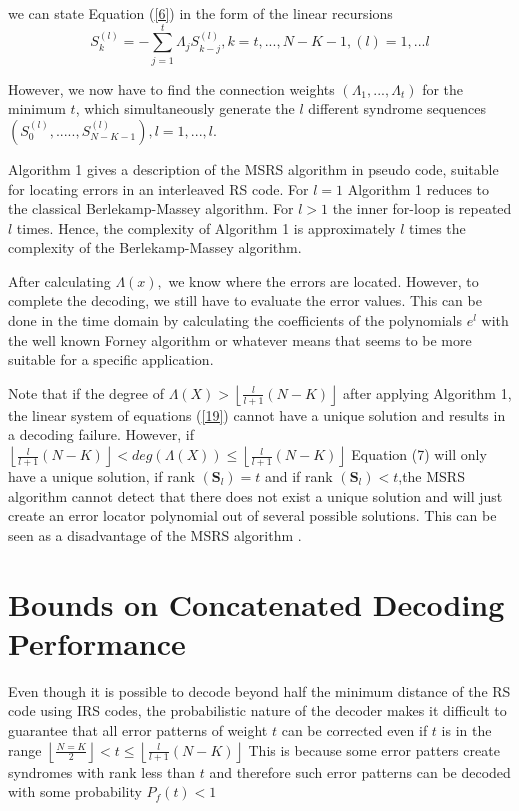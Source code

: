 \documentclass[fontsize=12pt]{article}
\begin{document}
we can state Equation (\ref{6}) in the form of the linear recursions
\begin{equation}
S_k^{(\mathit{l})} = -\sum_{j=1}^{t} \Lambda_jS_{k-j}^{(\mathit{l})}, k=t,...,N-K-1, (\mathit{l})=1,...l
\end{equation}

However, we now have to find the connection weights $(\Lambda_1,...,\Lambda_t)$ for the minimum $t$, which simultaneously generate
the $l$ different syndrome sequences $(S_0^{(\mathit{l})},.....,S_{N-K-1}^{(\mathit{l})}), \mathit{l}=1,...,l$.

Algorithm 1 gives a description of the MSRS algorithm
in pseudo code, suitable for locating errors in an interleaved
RS code. For $l=1$ Algorithm 1  reduces to
the classical Berlekamp-Massey algorithm. For $l > 1$ the
inner for-loop is repeated $l$ times. Hence, the complexity
of Algorithm 1 is approximately $l$ times the complexity of
the Berlekamp-Massey algorithm.

After calculating $\Lambda(x), $ we know where the errors are
located. However, to complete the decoding, we still have
to evaluate the error values. This can be done in the time
domain by calculating the coefficients of the polynomials $e^{\mathit{l}}$
with the well known Forney algorithm or whatever means that 
seems to be more suitable for a specific application.

Note that if the degree of $\Lambda(X) > \left \lfloor \frac{l}{l+1} ({N - K}) \right \rfloor$ after applying
Algorithm 1, the linear system of equations (\ref{19}) cannot have
a unique solution and results in a decoding failure.
However, if $\left \lfloor \frac{l}{l+1} ({N - K}) \right \rfloor < deg(\Lambda(X)) \leq \left \lfloor \frac{l}{l+1} ({N - K}) \right \rfloor$
Equation (7) will only have a unique solution, if 
rank $(\mathbf{S}_l)=t$ and if rank $(\mathbf{S}_l)<t$,the MSRS algorithm cannot detect that there does not exist a unique solution and will just create
an error locator polynomial out of several possible solutions.
 This can be seen as a disadvantage of the MSRS algorithm .

\section{Bounds on Concatenated Decoding Performance}
Even though it is possible to decode beyond half the minimum distance of the RS code using IRS codes, the probabilistic nature of the decoder makes it difficult to guarantee that all error patterns of weight $t$ can be corrected even if $t$ is in the range $ \left \lfloor \frac{N=K}{2} \right \rfloor < t \leq  \left \lfloor \frac{l}{l+1} ({N - K}) \right \rfloor$ This is because some error patters create syndromes with rank less than $t$ and therefore such error patterns can be decoded with some probability $P_f(t) < 1$
\end{document}
